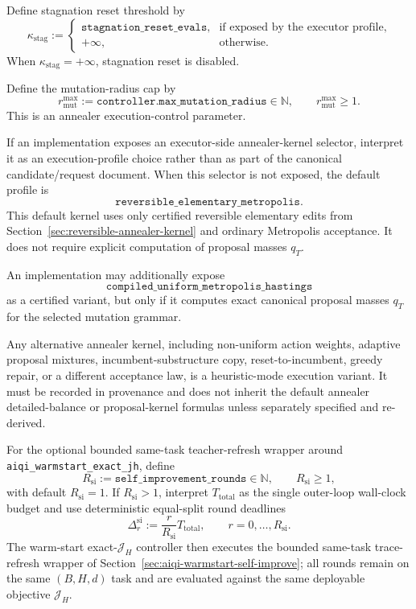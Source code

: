 \documentclass[11pt]{article}
\begin{document}
Define stagnation reset threshold by
\[
\kappa_{\mathrm{stag}}:=
\begin{cases}
\texttt{stagnation\_reset\_evals}, & \text{if exposed by the executor profile},\\
+\infty, & \text{otherwise.}
\end{cases}
\]
When $\kappa_{\mathrm{stag}}=+\infty$, stagnation reset is disabled.

Define the mutation-radius cap by
\[
r_{\mathrm{mut}}^{\max}:=\texttt{controller.max\_mutation\_radius}\in\mathbb{N},
\qquad
r_{\mathrm{mut}}^{\max}\ge 1.
\]
This is an annealer execution-control parameter.

If an implementation exposes an executor-side annealer-kernel selector,
interpret it as an execution-profile choice rather than as part of the
canonical candidate/request document. When this selector is not exposed, the
default profile is
\[
\texttt{reversible\_elementary\_metropolis}.
\]
This default kernel uses only certified reversible elementary edits from
Section~\ref{sec:reversible-annealer-kernel} and ordinary Metropolis
acceptance. It does not require explicit computation of proposal masses
$q_T$.

An implementation may additionally expose
\[
\texttt{compiled\_uniform\_metropolis\_hastings}
\]
as a certified variant, but only if it computes exact canonical proposal
masses $q_T$ for the selected mutation grammar.

Any alternative annealer kernel, including non-uniform action weights,
adaptive proposal mixtures, incumbent-substructure copy,
reset-to-incumbent, greedy repair, or a different acceptance law, is a
heuristic-mode execution variant. It must be recorded in provenance and does
not inherit the default annealer detailed-balance or proposal-kernel formulas
unless separately specified and re-derived.

For the optional bounded same-task teacher-refresh wrapper around
\texttt{aiqi\_warmstart\_exact\allowbreak\_jh}, define
\[
R_{\mathrm{si}}:=\texttt{self\_improvement\_rounds}\in\mathbb{N},
\qquad
R_{\mathrm{si}}\ge 1,
\]
with default $R_{\mathrm{si}}=1$.
If $R_{\mathrm{si}}>1$, interpret $T_{\mathrm{total}}$ as the single
outer-loop wall-clock budget and use deterministic equal-split round deadlines
\[
\Delta_r^{\mathrm{si}}:=\frac{r}{R_{\mathrm{si}}}T_{\mathrm{total}},
\qquad r=0,\dots,R_{\mathrm{si}}.
\]
The warm-start exact-$\mathcal{J}_H$ controller then executes the bounded
same-task trace-refresh wrapper of
Section~\ref{sec:aiqi-warmstart-self-improve}; all rounds remain on the same
$(B,H,d)$ task and are evaluated against the same deployable objective
$\mathcal{J}_H$.
\end{document}
